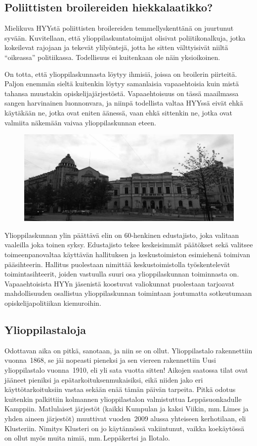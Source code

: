 \documentclass[a5paper, 8pt, twocolumn]{book} %
\numberwithin{equation}{section}
\begin{document}
\subsection*{Poliittisten broilereiden hiekkalaatikko?}
Mielikuva HYYstä poliittisten broilereiden
temmellyskenttänä on juurtunut
syvään. Kuvitellaan, että ylioppilaskuntatoimijat
olisivat poliitikonalkuja,
jotka kokeilevat rajojaan
ja tekevät ylilyöntejä, jotta
he sitten välttyisivät niiltä
``oikeassa'' politiikassa.
Todellisuus ei kuitenkaan
ole näin yksioikoinen.

On totta, että ylioppilaskunnasta
löytyy
ihmisiä, joissa on
broilerin piirteitä. Paljon
enemmän sieltä kuitenkin
löytyy samanlaisia vapaaehtoisia
kuin mistä tahansa muustakin
opiskelijajärjestöstä. Vapaaehtoisuus
on tässä maailmassa sangen harvinainen
luonnonvara, ja niinpä todellista valtaa
HYYssä eivät ehkä käytäkään ne, jotka
ovat eniten äänessä, vaan ehkä sittenkin
ne, jotka ovat valmiita näkemään vaivaa
ylioppilaskunnan eteen.
\begin{figure}[!b]
	\centering
	\includegraphics[width=\textwidth]{vanhajauusi.png}
\end{figure}

Ylioppilaskunnan ylin päättävä elin
on 60-henkinen edustajisto, joka valitaan
vaaleilla joka toinen syksy. Edustajisto tekee keskeisimmät päätökset sekä valitsee
toimeenpanovaltaa käyttävän hallituksen
ja keskustoimiston esimiehenä toimivan
pääsihteerin. Hallitus puolestaan nimittää
keskustoimistolla työskentelevät toimintasihteerit,
joiden vastuulla suuri osa ylioppilaskunnan
toiminnasta on. Vapaaehtoisista
HYYn jäsenistä koostuvat valiokunnat
puolestaan tarjoavat mahdollisuuden osallistua
ylioppilaskunnan toimintaan joutumatta
sotkeutumaan opiskelijapolitiikan
kiemuroihin.
\subsection*{Ylioppilastaloja}
Odottavan aika on pitkä, sanotaan, ja
niin se on ollut. Ylioppilastalo rakennettiin
vuonna~1868, se jäi nopeasti pieneksi
ja sen viereen rakennettiin Uusi ylioppilastalo
vuonna~1910, eli yli sata vuotta sitten!
Aikojen saatossa tilat ovat jääneet pieniksi
ja epätarkoituksenmukaisiksi, eikä niiden
jako eri käyttötarkoituksiin vastaa sekään
enää tämän päivän tarpeita.
Pitkä odotus kuitenkin palkittiin kolmannen
ylioppilastalon valmistuttua Leppäsuonkadulle
Kamppiin. Matlulaiset
järjestöt (kaikki Kumpulan ja kaksi Viikin,
mm.\,Limes ja yhden aineen järjestöt)
muuttivat vuoden~2009 alussa yhteiseen kerhotilaan,
eli Klusteriin. Nimitys Klusteri on jo käytännössä vakiintunut, vaikka koekäytössä
on ollut myös muita nimiä, mm.\,Leppäkertsi
ja Ilotalo.
\end{document}
